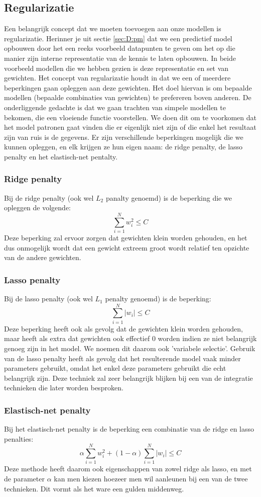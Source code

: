 \begin{abstract*}
\subsection{Regularizatie}
Een belangrijk concept dat we moeten toevoegen aan onze modellen is regularizatie. Herinner je uit sectie \ref{sec:D:pm} dat we een predictief model opbouwen door het een reeks voorbeeld datapunten te geven om het op die manier zijn interne representatie van de kennis te laten opbouwen. In beide voorbeeld modellen die we hebben gezien is deze representatie en set van gewichten. Het concept van regularizatie houdt in dat we een of meerdere beperkingen gaan opleggen aan deze gewichten. Het doel hiervan is om bepaalde modellen (bepaalde combinaties van gewichten) te prefereren boven anderen. De onderliggende gedachte is dat we gaan trachten van simpele modellen te bekomen, die een vloeiende functie voorstellen. We doen dit om te voorkomen dat het model patronen gaat vinden die er eigenlijk niet zijn of die enkel het resultaat zijn van ruis is de gegevens. Er zijn verschillende beperkingen mogelijk die we kunnen opleggen, en elk krijgen ze hun eigen naam: de ridge penalty, de lasso penalty en het elastisch-net pentalty.
\subsubsection{Ridge penalty}
Bij de ridge penalty (ook wel $L_{2}$ panalty genoemd) is de beperking die we opleggen de volgende:
$$
\sum_{i=1}^{N}w_{i}^{2} \leq C
$$
Deze beperking zal ervoor zorgen dat gewichten klein worden gehouden, en het dus onmogelijk wordt dat een gewicht extreem groot wordt relatief ten opzichte van de andere gewichten.
\subsubsection{Lasso penalty}
Bij de lasso penalty (ook wel $L_{1}$ penalty genoemd) is de beperking:
$$
\sum_{i=1}^{N}\lvert w_{i}\rvert \leq C
$$
Deze beperking heeft ook als gevolg dat de gewichten klein worden gehouden, maar heeft als extra dat gewichten ook effectief 0 worden indien ze niet belangrijk genoeg zijn in het model. We noemen dit daarom ook 'variabele selectie'. Gebruik van de lasso penalty heeft als gevolg dat het resulterende model vaak minder parameters gebruikt, omdat het enkel deze parameters gebruikt die echt belangrijk zijn. Deze techniek zal zeer belangrijk blijken bij een van de integratie technieken die later worden besproken.
\subsubsection{Elastisch-net penalty}
Bij het elastisch-net penalty is de beperking een combinatie van de ridge en lasso penalties:
$$
\alpha \sum_{i=1}^{N}w_{i}^{2} + (1-\alpha)\sum_{i=1}^{N}\lvert w_{i}\rvert \leq C
$$
Deze methode heeft daarom ook eigenschappen van zowel ridge als lasso, en met de parameter $\alpha$ kan men kiezen hoezeer men wil aanleunen bij een van de twee technieken. Dit vormt als het ware een gulden middenweg.

\end{abstract*}
